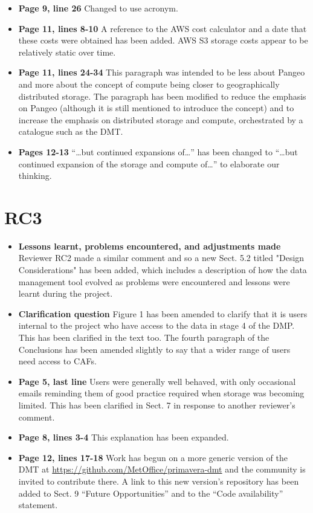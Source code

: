 \documentclass[12pt,a4paper]{article}
\begin{document}
\begin{itemize}
\item \textbf{Page 9, line 26} Changed to use acronym.

\item \textbf{Page 11, lines 8-10} A reference to the AWS cost calculator and a date that these costs were obtained has been added. AWS S3 storage costs appear to be relatively static over time.

\item \textbf{Page 11, lines 24-34} This paragraph was intended to be less about Pangeo and more about the concept of compute being closer to geographically distributed storage. The paragraph has been modified to reduce the emphasis on Pangeo (although it is still mentioned to introduce the concept) and to increase the emphasis on distributed storage and compute, orchestrated by a catalogue such as the DMT.

\item \textbf{Pages 12-13} ``\ldots but continued expansions of\ldots'' has been changed to ``\ldots but continued expansion of the storage and compute of\dots'' to elaborate our thinking.

\end{itemize}

\section{RC3}

\begin{itemize}
\item \textbf{Lessons learnt, problems encountered, and adjustments made} Reviewer RC2 made a similar comment and so a new Sect. 5.2 titled "Design Considerations" has been added, which includes a description of how the data management tool evolved as problems were encountered and lessons were learnt during the project.

\item \textbf{Clarification question} Figure 1 has been amended to clarify that it is users internal to the project who have access to the data in stage 4 of the DMP. This has been clarified in the text too. The fourth paragraph of the Conclusions has been amended slightly to say that a wider range of users need access to CAFs.

\item \textbf{Page 5, last line} Users were generally well behaved, with only occasional emails reminding them of good practice required when storage was becoming limited. This has been clarified in Sect. 7 in response to another reviewer's comment.

\item \textbf{Page 8, lines 3-4} This explanation has been expanded.

\item \textbf{Page 12, lines 17-18} Work has begun on a more generic version of the DMT at \url{https://github.com/MetOffice/primavera-dmt} and the community is invited to contribute there. A link to this new version's repository has been added to Sect. 9 ``Future Opportunities'' and to the ``Code availability'' statement.

\end{itemize}
\end{document}
